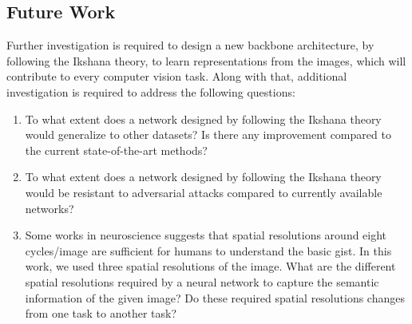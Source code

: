\documentclass{article}
\begin{document}
\subsection{Future Work}
Further investigation is required to design a new backbone architecture, by following the Ikshana theory, to learn representations from the images, which will contribute to every computer vision task. Along with that, additional investigation is required to address the following questions:
\begin{enumerate}
    \item To what extent does a network designed by following the Ikshana theory would generalize to other datasets? Is there any improvement compared to the current state-of-the-art methods? 
    \item To what extent does a network designed by following the Ikshana theory would be resistant to adversarial attacks compared to currently available networks?
    \item Some works\cite{oliva2000diagnostic}\cite{oliva2001modeling} in neuroscience suggests that spatial resolutions around eight cycles/image are sufficient for humans to understand the basic gist. In this work, we used three spatial resolutions of the image. What are the different spatial resolutions required by a neural network to capture the semantic information of the given image? Do these required spatial resolutions changes from one task to another task?
\end{enumerate}


  
  
\end{document}

